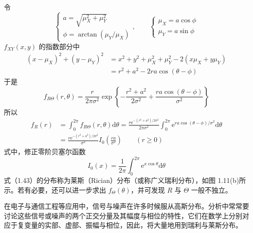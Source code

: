 \documentclass[11pt,openany,UTF8]{ctexbook}
\newcommand{\dif}{\mathrm{d}}                      %
\newcommand{\eu}{\mathrm{e}}                       %
\begin{document}
\begin{examplebox}
令
\[
\begin{cases}
a=\sqrt{\mu_X^2+\mu_Y^2}\\
\phi=\arctan(\mu_Y/\mu_X)
\end{cases},\qquad
\begin{cases}
\mu_X=a\cos\phi\\
\mu_Y=a\sin\phi
\end{cases}
\]
$f_{XY}(x,y)$ 的指数部分中
\[
\begin{aligned}
(x-\mu_X)^2+(y-\mu_Y)^2&=x^2+y^2+\mu_X^2+\mu_Y^2-2(x\mu_X+y\mu_Y)\\
&=r^2+a^2-2ra\cos(\theta-\phi)
\end{aligned}
\]
于是
\[
f_{R\Theta}(r,\theta)=\frac{r}{2\pi\sigma^2}\exp\left\{-\frac{r^2+a^2}{2\sigma^2}+\frac{ra\cos(\theta-\phi)}{\sigma^2}\right\}
\]
所以
\begin{equation}
\begin{aligned}
f_R(r)&=\int_0^{2\pi}f_{R\Theta}(r,\theta)\dif\theta
       =\frac{r\eu^{-(r^2+a^2)/2\sigma^2}}{2\pi\sigma^2}\int_0^{2\pi}\eu^{ra\cos(\theta-\phi)/\sigma^2}\dif\theta\\
&=\frac{r\eu^{-(r^2+a^2)/2\sigma^2}}{\sigma^2}I_0\left(\frac{ra}{\sigma^2}\right)\qquad(r\geqslant 0)
\end{aligned}
\label{eq:1.43}
\end{equation}
式中\nobreak，修正零阶贝塞尔函数
\begin{equation}
I_0(x)=\frac{1}{2\pi}\int_0^{2\pi}\eu^{x\cos\theta}\dif\theta
\label{eq:1.44}
\end{equation}
式（1.43\nobreak）的分布称为莱斯（Rician\nobreak）分布（或称广义瑞利分布\nobreak）\nobreak，如图 1.11(b)所示\nobreak。若有必要\nobreak，还可以进一步求出 $f_\Theta(\theta)$\nobreak，并可发现 $R$ 与 $\Theta$ 一般不独立\nobreak。
\end{examplebox}

在电子与通信工程等应用中\nobreak，信号与噪声在许多时候服从高斯分布\nobreak。分析中常常要讨论这些信号或噪声的两个正交分量及其幅度与相位的特性\nobreak，它们在数学上分别对应于复变量的实部\nobreak、虚部\nobreak、振幅与相位\nobreak，因此\nobreak，将大量地用到瑞利与莱斯分布\nobreak。
\end{document}
